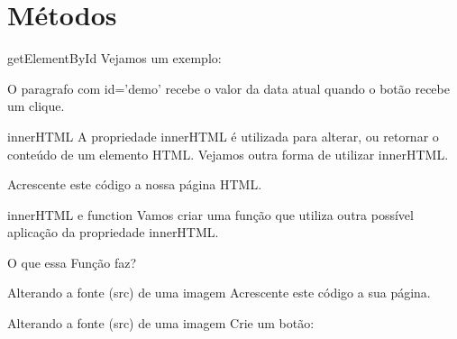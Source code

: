 \documentclass{beamer}
\begin{document}
\section{Métodos}
\begin{frame}{getElementById}
	Vejamos um exemplo:\\
	\begin{center}
			

		\end{center}
		\pause O paragrafo com id='demo' recebe o valor da data atual quando o botão recebe um clique.
\end{frame}
\begin{frame}{innerHTML}
A propriedade innerHTML é utilizada para alterar, ou retornar o conteúdo de um elemento HTML.
Vejamos outra forma de utilizar innerHTML.
\begin{center}
			

		\end{center}
		\pause Acrescente este código a nossa página HTML.
\end{frame}
\begin{frame}{innerHTML e function}
Vamos criar uma função que utiliza outra possível aplicação da propriedade innerHTML.
	\begin{center}
		

	\end{center}
	\pause O que essa Função faz?
\end{frame}
\begin{frame}{Alterando a fonte (src) de uma imagem}
Acrescente este código a sua página.
 \begin{center}
	
 \end{center}
\end{frame}
\begin{frame}{Alterando a fonte (src) de uma imagem}
Crie um botão:
 \begin{center}
	
 \end{center}

\end{frame}
\end{document}
